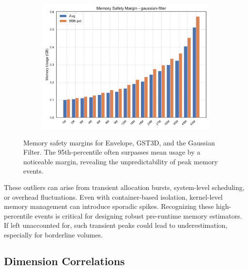 \begin{figure}[htbp]
\begin{subfigure}[t]{0.49\textwidth}
        \includegraphics[width=\textwidth]{assets/images/05/memory_safety_margin_gaussian-filter}
    \end{subfigure}
    \caption{Memory safety margins for Envelope, \ac{GST3D}, and the Gaussian Filter. The 95th-percentile often surpasses mean usage by a noticeable margin, revealing the unpredictability of peak memory events.}
    \label{fig:memory_safety_margin}
\end{figure}

These outliers can arise from transient allocation bursts, system-level scheduling, or overhead fluctuations.
Even with container-based isolation, kernel-level memory management can introduce sporadic spikes.
Recognizing these high-percentile events is critical for designing robust pre-runtime memory estimators.
If left unaccounted for, such transient peaks could lead to underestimation, especially for borderline volumes.



\subsection{Dimension Correlations}
\label{subsec:dimension-correlations}

